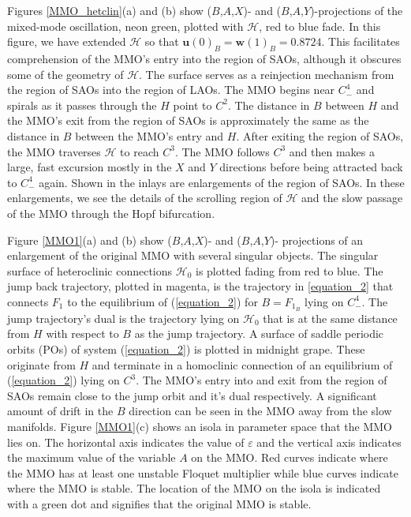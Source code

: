 \documentclass{ws-ijbc}
\begin{document}
Figures \ref{MMO_hetclin}(a) and (b)  show ($B$,$A$,$X$)- and ($B$,$A$,$Y$)-projections of the mixed-mode oscillation, neon green, plotted with $\mathscr{H}$, red to blue fade.  In this figure, we have extended $\mathscr{H}$ so that $\mathbf{u}(0)_B = \mathbf{w}(1)_B = 0.8724$. This facilitates comprehension of the MMO's entry into the region of SAOs, although it obscures some of the geometry of $\mathscr{H}$.  The surface serves as a reinjection mechanism from the region of SAOs into the region of LAOs.  The MMO begins near $C^4_-$ and spirals as it passes through the $H$ point to $C^2$.  The distance in $B$ between $H$ and the MMO's exit from the region of SAOs is approximately the same as the distance in $B$ between the MMO's entry and $H$.  After exiting the region of SAOs, the MMO traverses $\mathscr{H}$ to reach $C^3$.  The MMO follows $C^3$ and then makes a large, fast excursion mostly in the $X$ and $Y$ directions before being attracted back to $C^4_-$ again.  Shown in the inlays are enlargements of the region of SAOs.  In these enlargements, we see the details of the scrolling region of $\mathscr{H}$ and the slow passage of the MMO through the Hopf bifurcation.

Figure \ref{MMO1}(a) and (b) show ($B$,$A$,$X$)- and ($B$,$A$,$Y$)- projections of an enlargement of the original MMO with several singular objects.  The singular surface of heteroclinic connections $\mathscr{H}_0$ is plotted fading from red to blue.  The jump back trajectory, plotted in magenta, is the trajectory in \ref{equation_2} that connects $F_1$ to the equilibrium of (\ref{equation_2}) for $B=F_{1_B}$ lying on $C^4_-$.  The jump trajectory's dual is the trajectory lying on $\mathscr{H}_0$ that is at the same distance from $H$ with respect to $B$ as the jump trajectory.  A surface of saddle periodic orbits (POs) of system (\ref{equation_2}) is plotted in midnight grape.  These originate from $H$ and terminate in a homoclinic connection of an equilibrium of (\ref{equation_2}) lying on $C^3$.  The MMO's entry into and exit from the region of SAOs remain close to the jump orbit and it's dual respectively.  A significant amount of drift in the $B$ direction can be seen in the MMO away from the slow manifolds.  Figure \ref{MMO1}(c) shows an isola in parameter space that the MMO lies on.  The horizontal axis indicates the value of $\varepsilon$ and the vertical axis indicates the maximum value of the variable $A$ on the MMO.  Red curves indicate where the MMO has at least one unstable Floquet multiplier while blue curves indicate where the MMO is stable.  The location of the MMO on the isola is indicated with a green dot and signifies that the original MMO is stable.
\end{document}
